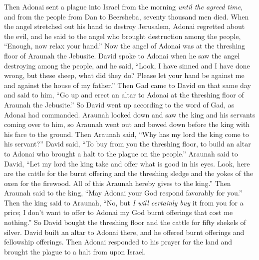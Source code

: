 \begin{biblechapter}
\verse Then Adonai sent a plague into Israel from the morning \textit{until the agreed time}, and from the people from Dan to Beersheba, seventy thousand men died.
\verse When the angel stretched out his hand to destroy Jerusalem, Adonai regretted about the evil, and he said to the angel who brought destruction among the people, “Enough, now relax your hand.” Now the angel of Adonai was at the threshing floor of Araunah the Jebusite.
\verse David spoke to Adonai when he saw the angel destroying among the people, and he said, “Look, I have sinned and I have done wrong, but these sheep, what did they do? Please let your hand be against me and against the house of my father.”
\verse Then Gad came to David on that same day and said to him, “Go up and erect an altar to Adonai at the threshing floor of Araunah the Jebusite.”
\verse So David went up according to the word of Gad, as Adonai had commanded.
\verse Araunah looked down and saw the king and his servants coming over to him, so Araunah went out and bowed down before the king with his face to the ground.
\verse Then Araunah said, “Why has my lord the king come to his servant?” David said, “To buy from you the threshing floor, to build an altar to Adonai who brought a halt to the plague on the people.”
\verse Araunah said to David, “Let my lord the king take and offer what is good in his eyes. Look, here are the cattle for the burnt offering and the threshing sledge and the yokes of the oxen for the firewood.
\verse All of this Araunah hereby gives to the king.” Then Araunah said to the king, “May Adonai your God respond favorably for you.”
\verse Then the king said to Araunah, “No, but \textit{I will certainly buy} it from you for a price; I don’t want to offer to Adonai my God burnt offerings that cost me nothing.” So David bought the threshing floor and the cattle for fifty shekels of silver.
\verse David built an altar to Adonai there, and he offered burnt offerings and fellowship offerings. Then Adonai responded to his prayer for the land and brought the plague to a halt from upon Israel.
\end{biblechapter}

